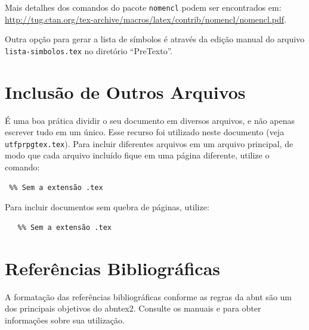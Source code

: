 Mais detalhes dos comandos do pacote \texttt{nomencl} podem ser encontrados em: \url{http://tug.ctan.org/tex-archive/macros/latex/contrib/nomencl/nomencl.pdf}.

Outra opção para gerar a lista de símbolos é através da edição manual do arquivo \texttt{lista-simbolos.tex} no diretório ``PreTexto''.

\section{Inclusão de Outros Arquivos}\label{sec:inclusao}

É uma boa prática dividir o seu documento em diversos arquivos, e não apenas escrever tudo em um único. Esse recurso foi utilizado neste documento (veja \texttt{utfprpgtex.tex}). Para incluir diferentes arquivos em um arquivo principal, de modo que cada arquivo incluído fique em uma página diferente, utilize o comando:

\begin{SingleSpacing}%
\begin{verbatim}
 %% Sem a extensão .tex
\end{verbatim}
\end{SingleSpacing}

Para incluir documentos sem quebra de páginas, utilize:

\begin{SingleSpacing}%
\begin{verbatim}
   %% Sem a extensão .tex
\end{verbatim}
\end{SingleSpacing}

\section{Referências Bibliográficas}\label{sec:referencias}

A formatação das referências bibliográficas conforme as regras da \gls{abnt} são um dos principais objetivos do \gls{abntex2}. Consulte os manuais  e  para obter informações sobre sua utilização.

